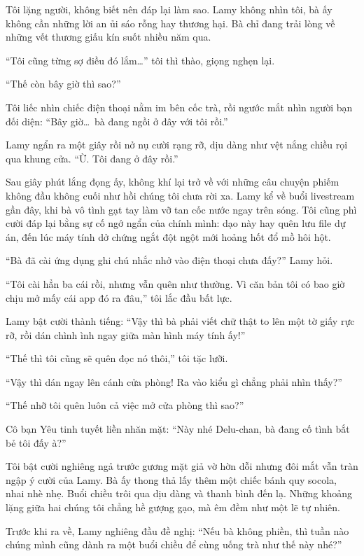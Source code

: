 \documentclass[../main.tex]{subfiles}
\begin{document}
Tôi lặng người, không biết nên đáp lại làm sao. Lamy không nhìn tôi, bà ấy không cần những lời an ủi sáo rỗng hay thương hại. Bà chỉ đang trải lòng về những vết thương giấu kín suốt nhiều năm qua.

``Tôi cũng từng sợ điều đó lắm\dots'' tôi thì thào, giọng nghẹn lại.

``Thế còn bây giờ thì sao?''

Tôi liếc nhìn chiếc điện thoại nằm im bên cốc trà, rồi ngước mắt nhìn người bạn đối diện: ``Bây giờ\dots\ bà đang ngồi ở đây với tôi rồi.''

Lamy ngẩn ra một giây rồi nở nụ cười rạng rỡ, dịu dàng như vệt nắng chiều rọi qua khung cửa. ``Ừ. Tôi đang ở đây rồi.''

\ct

Sau giây phút lắng đọng ấy, không khí lại trở về với những câu chuyện phiếm không đầu không cuối như hồi chúng tôi chưa rời xa. Lamy kể về buổi livestream gần đây, khi bà vô tình gạt tay làm vỡ tan cốc nước ngay trên sóng. Tôi cũng phì cười đáp lại bằng sự cố ngớ ngẩn của chính mình: dạo này hay quên lưu file dự án, đến lúc máy tính dở chứng ngắt đột ngột mới hoảng hốt đổ mồ hôi hột.

``Bà đã cài ứng dụng ghi chú nhắc nhở vào điện thoại chưa đấy?'' Lamy hỏi.

``Tôi cài hẳn ba cái rồi, nhưng vẫn quên như thường. Vì căn bản tôi có bao giờ chịu mở mấy cái app đó ra đâu,'' tôi lắc đầu bất lực.

Lamy bật cười thành tiếng: ``Vậy thì bà phải viết chữ thật to lên một tờ giấy rực rỡ, rồi dán chình ình ngay giữa màn hình máy tính ấy!''

``Thế thì tôi cũng sẽ quên đọc nó thôi,'' tôi tặc lưỡi.

``Vậy thì dán ngay lên cánh cửa phòng! Ra vào kiểu gì chẳng phải nhìn thấy?''

``Thế nhỡ tôi quên luôn cả việc mở cửa phòng thì sao?''

Cô bạn Yêu tinh tuyết liền nhăn mặt: ``Này nhé Delu-chan, bà đang cố tình bắt bẻ tôi đấy à?''

Tôi bật cười nghiêng ngả trước gương mặt giả vờ hờn dỗi nhưng đôi mắt vẫn tràn ngập ý cười của Lamy. Bà ấy thong thả lấy thêm một chiếc bánh quy socola, nhai nhè nhẹ. Buổi chiều trôi qua dịu dàng và thanh bình đến lạ. Những khoảng lặng giữa hai chúng tôi chẳng hề gượng gạo, mà êm đềm như một lẽ tự nhiên.

Trước khi ra về, Lamy nghiêng đầu đề nghị: ``Nếu bà không phiền, thì tuần nào chúng mình cũng dành ra một buổi chiều để cùng uống trà như thế này nhé?''
\end{document}

